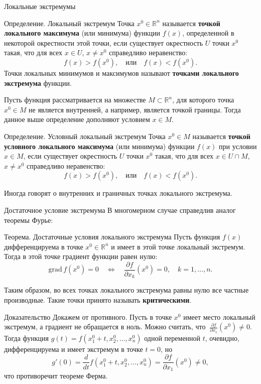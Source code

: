 \documentclass[8pt]{beamer}
\newcommand{\grad}{\mathrm{grad\,}}
\newcommand{\pp}[2]{\frac{\partial #1}{\partial #2}}
\begin{document}
\begin{frame}{Локальные экстремумы}
\begin{block}{Определение. Локальный экстремум}
Точка $x^0\in\mathbb{R}^n$ называется {\bf точкой локального максимума} (или минимума) функции $f(x)$, определенной в некоторой окрестности этой точки, если существует окрестность $U$ точки $x^0$ такая, что для всех $x\in U$, $x\ne x^0$ справедливо неравенство:
$$f(x) > f(x^0),\quad \text{или}\quad f(x)<f(x^0).$$
Точки локальных минимумов и максимумов называют {\bf точками локального экстремума} функции.
\end{block}
\pause
Пусть функция рассматривается на множестве $M\subset\mathbb{R}^n$, для которого точка $x^0\in M$ не является внутренней, а например, является точкой границы. Тогда данное выше определение дополняют условием $x\in M$.
\begin{block}{Определение. Условный локальный экстремум}
Точка $x^0\in M$ называется {\bf точкой условного локального максимума} (или минимума) функции $f(x)$ при условии $x\in M$, если существует окрестность $U$ точки $x^0$ такая, что для всех $x\in U\cap M$, $x\ne x^0$ справедливо неравенство:
$$f(x) > f(x^0),\quad \text{или}\quad f(x)<f(x^0).$$
\end{block}
Иногда говорят о внутренних и граничных точках локального экстремума.
\end{frame}

\begin{frame}{Достаточное условие экстремума}
В многомерном случае справедлив аналог теоремы Фурье:
\begin{block}{Теорема. Достаточные условия локального экстремума}
Пусть функция $f(x)$ дифференцируема в точке $x^0\in\mathbb{R}^n$ и имеет в этой точке локальный экстремум. Тогда в этой точке градиент функции равен нулю:
$$\grad f(x^0) = 0\quad \iff\quad \pp{f}{x_k}(x^0) = 0,\quad k=1,\ldots,n.$$
\end{block}
Таким образом, во всех точках локального экстремума равны нулю все частные производные. Такие точки принято называть {\bf критическими}.
\begin{block}{Доказательство}
Докажем от противного. Пусть в точке $x^0$ имеет место локальный экстремум, а градиент не обращается в ноль. Можно считать, что $\ \displaystyle \pp{f}{x_1}(x^0)\ne 0$. Тогда функция $g(t) = f(x_1^0+t,x_2^0,\ldots,x_n^0)$ одной переменной $t$, очевидно, дифференцируема и имеет экстремум в точке $t=0$, но
$$g'(0) = \frac{d}{dt}f(x_1^0+t,x_2^0,\ldots,x_n^0) = \pp{f}{x_1}(x^0)\ne0,$$
что противоречит теореме Ферма.
\end{block}
\end{frame}
\end{document}
